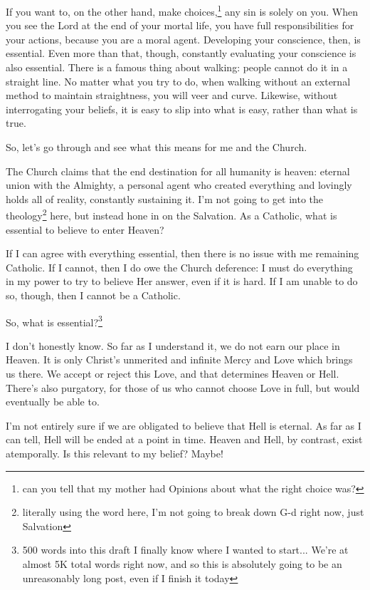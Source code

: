\documentclass[12pt]{article}
\renewcommand{\,}{\textsuperscript{,}}
\begin{document}
If you want to, on the other hand, make choices,\footnote{can you tell that my mother had Opinions about what the right choice was?} any sin is solely on you.  
When you see the Lord at the end of your mortal life, you have full responsibilities for your actions, because you are a moral agent.  
Developing your conscience, then, is essential.  
Even more than that, though, constantly evaluating your conscience is also essential.  
There is a famous thing about walking: people cannot do it in a straight line.  
No matter what you try to do, when walking without an external method to maintain straightness, you will veer and curve.  
Likewise, without interrogating your beliefs, it is easy to slip into what is easy, rather than what is true.

So, let's go through and see what this means for me and the Church.

The Church claims that the end destination for all humanity is heaven: eternal union with the Almighty, a personal agent who created everything and lovingly holds all of reality, constantly sustaining it.  
I'm not going to get into the theology\footnote{literally using the word here, I'm not going to break down G-d right now, just Salvation} here, but instead hone in on the Salvation.  
As a Catholic, what is essential to believe to enter Heaven?

If I can agree with everything essential, then there is no issue with me remaining Catholic.  
If I cannot, then I do owe the Church deference: I must do everything in my power to try to believe Her answer, even if it is hard.  
If I am unable to do so, though, then I cannot be a Catholic.

So, what is essential?\footnote{500 words into this draft I finally know where I wanted to start... We're at almost 5K total words right now, and so this is absolutely going to be an unreasonably long post, even if I finish it today}

I don't honestly know.  
So far as I understand it, we do not earn our place in Heaven.  
It is only Christ's unmerited and infinite Mercy and Love which brings us there.  
We accept or reject this Love, and that determines Heaven or Hell.  
There's also purgatory, for those of us who cannot choose Love in full, but would eventually be able to.

I'm not entirely sure if we are obligated to believe that Hell is eternal.  
As far as I can tell, Hell will be ended at a point in time.  
Heaven and Hell, by contrast, exist atemporally.  
Is this relevant to my belief? Maybe!
\end{document}

